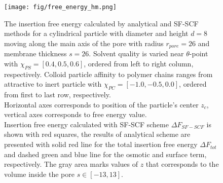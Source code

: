 \documentclass[12pt, a4paper]{article}
\begin{document}


\begin{figure}
    \centering
    \texttt{[image: fig/free\_energy\_hm.png]}
    \caption{ 
The insertion free energy calculated by analytical and SF-SCF methods for a cylindrical particle with diameter and height $d=8$ moving along the main axis of the pore with radius $r_{pore} = 26$ and membrane thickness $s=26$.
    Solvent quality is varied near $\theta$-point with $\chi_{PS} = [0.4, 0.5, 0.6]$, ordered from left to right column, respectively.
    Colloid particle affinity to polymer chains ranges from attractive to inert particle with $\chi_{PC} = [-1.0, -0.5, 0.0]$, ordered from first to last row, respectively.
    \\
    Horizontal axes corresponds to position of the particle's center $z_c$, vertical axes corresponds to free energy value.
    \\
    Insertion free energy calculated with SF-SCF scheme $\Delta F_{SF-SCF}$ is shown with red squares, the results of analytical scheme are presented with solid red line for the total insertion free energy $\Delta F_{tot}$ and dashed green and blue line for the osmotic and surface term, respectively.
    The gray area marks values of $z$ that corresponds to the volume inside the pore $s\in [-13, 13]$.
    \label{fig:fe_scf_grid}
    }
\end{figure}

\end{document}
